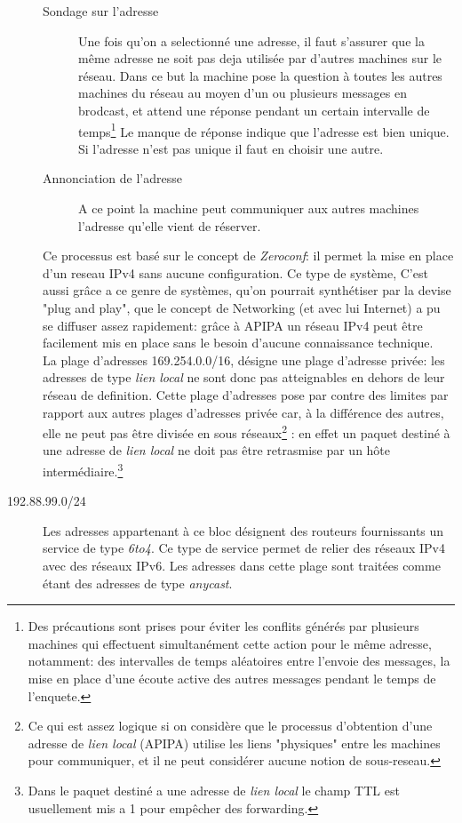 \begin{description}
\begin{description}
\item[Sondage sur l'adresse]
Une fois qu'on a selectionné une adresse, il faut s'assurer que la même adresse ne soit
pas deja utilisée par d'autres machines sur le réseau. Dans ce but la machine
pose la question à toutes les autres machines du réseau au moyen d'un ou plusieurs messages
en brodcast, et attend une réponse pendant un certain intervalle de temps\footnote{
Des précautions sont prises pour éviter les conflits générés par plusieurs
machines qui effectuent simultanément cette action pour le même adresse,
notamment: des intervalles de temps aléatoires entre l'envoie des messages, la mise
en place d'une écoute active des autres messages pendant le temps de l'enquete.}
Le manque de réponse indique que l'adresse est bien unique. Si l'adresse n'est
pas unique il faut en choisir une autre.

\item[Annonciation de l'adresse]
A ce point la machine peut communiquer aux autres machines l'adresse qu'elle
vient de réserver.

\end{description}



Ce processus est basé sur le concept de {\it Zeroconf}: il permet la mise en
place d'un reseau IPv4 sans aucune configuration. Ce type de système,
C'est aussi grâce a ce genre de systèmes, qu'on 
pourrait synthétiser par la devise %
"plug and play", que le concept de Networking (et avec lui Internet) a pu se
diffuser assez rapidement: grâce à APIPA un réseau IPv4 peut être facilement
mis en place sans le besoin d'aucune connaissance technique.\\

La plage d'adresses 169.254.0.0/16, désigne une plage d'adresse privée: les
adresses de type {\it lien local} ne sont donc pas atteignables en dehors de
leur réseau de definition. 
Cette plage d'adresses pose par contre des limites par rapport aux autres
plages d'adresses privée car, à la différence des autres, elle ne peut pas être
divisée en sous réseaux\footnote{Ce qui est assez logique si on considère que
le processus d'obtention d'une adresse de {\it lien local} (APIPA) utilise
les liens "physiques" entre les machines pour communiquer, et il ne peut
 considérer aucune notion de sous-reseau.}
: en effet un paquet destiné à une adresse de {\it lien local} ne doit pas être
retrasmise par un hôte intermédiaire.\footnote{Dans le paquet destiné
a une adresse de {\it lien local} le champ TTL est usuellement mis a 1
pour empêcher des forwarding.}

\item[192.88.99.0/24]
Les adresses appartenant à ce bloc désignent des routeurs 
fournissants un service de type {\it 6to4}. Ce type de service
permet de relier des réseaux IPv4 avec des réseaux IPv6.
Les adresses dans cette plage sont traitées comme étant des adresses
de type {\it anycast}.


\end{description}




